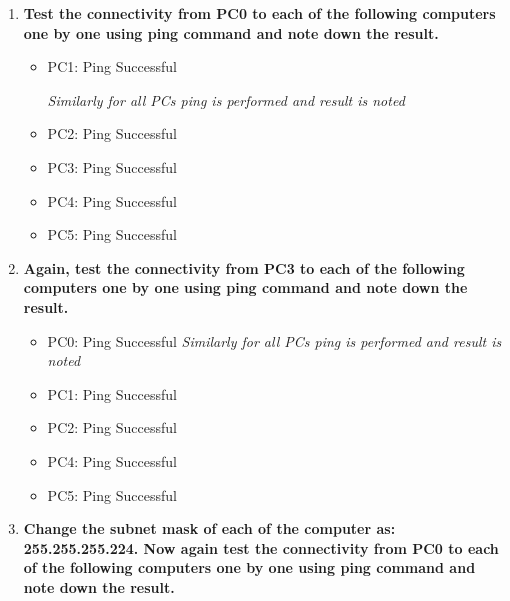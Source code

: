 \documentclass[a4paper,11pt]{article}
\begin{document}
\begin{enumerate}
      \item \textbf{Test the connectivity from PC0 to each of the following computers one by one using ping command and note down the result.}
            \begin{itemize}
                  \item PC1: Ping Successful
                        \textit{Similarly for all PCs ping  is performed and result is noted}\\
                  \item PC2: Ping Successful
                  \item PC3: Ping Successful
                  \item PC4: Ping Successful
                  \item PC5: Ping Successful
            \end{itemize}
      \item \textbf{Again, test the connectivity from PC3 to each of the following computers one by one using ping command and note down the result.}

            \begin{itemize}
                  \item PC0: Ping Successful
                        \textit{Similarly for all PCs ping  is performed and result is noted}\\
                  \item PC1: Ping Successful
                  \item PC2: Ping Successful
                  \item PC4: Ping Successful
                  \item PC5: Ping Successful
            \end{itemize}
      \item \textbf{Change the subnet mask of each of the computer as: 255.255.255.224. Now again test the connectivity from PC0 to each of the following computers one by one using ping command and note down the result.}


\end{enumerate}
\end{document}
